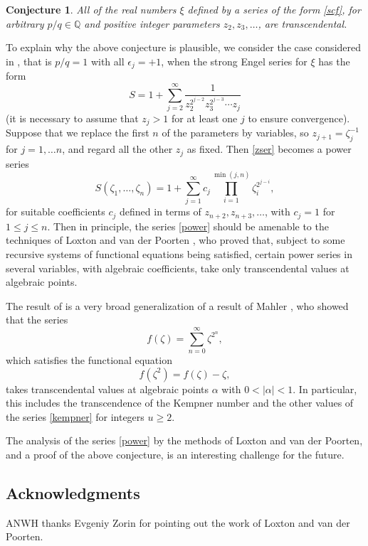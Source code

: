 \documentclass[12pt,a4paper]{amsart}
\newtheorem{conjecture}[theorem]{Conjecture}
\theoremstyle{definition}
\numberwithin{equation}{section}
\newcommand\al{{\alpha}}
\newcommand\eps{{\epsilon}}
\newcommand{\Q}{\mathbb{Q}}
\begin{document}
\begin{conjecture}
\label{transc} 
All of the real numbers $\xi$ defined by a series of the form \eqref{scf}, for arbitrary 
$p/q\in\Q$ and positive integer parameters $z_2,z_3,\ldots$, are transcendental. 
\end{conjecture} 

To explain why the above conjecture is plausible, we consider the case considered in \cite{Hone2}, 
that is $p/q=1$ with all $\eps_j=+1$, when the strong Engel series for $\xi$ has the form 
\begin{equation}
\label{zser}
S = 1+\sum_{j=2}^\infty \frac{1}{z_2^{2^{j-2}}z_3^{2^{j-3}}\cdots z_j} 
\end{equation} 
(it is necessary to assume that $z_j>1$ for at least one $j$ to ensure convergence). 
Suppose that we replace the first $n$ of the parameters by variables, so 
$z_{j+1} = \zeta_{j}^{-1}$ for $j=1,\ldots n$, and regard all the other $z_j$ as fixed. 
Then \eqref{zser} becomes a power series 
\begin{equation}
\label{power} 
S(\zeta_1,\ldots,\zeta_n) = 1+
\sum_{j=1}^\infty c_j \prod_{i=1}^{\min(j,n)}\zeta_i^{2^{j-i}},
\end{equation}  
for suitable coefficients $c_j$ defined in terms of $z_{n+2},z_{n+3},\ldots$, with 
$c_j=1$ for $1\leq j\leq n$. Then in principle, the series \eqref{power} should be amenable to the techniques 
of Loxton and van der Poorten \cite{loxtonvdp}, who proved that, subject to some 
recursive systems of functional equations being 
satisfied, certain power series in several variables, with algebraic coefficients, take 
only transcendental values at algebraic points. 

The result of \cite{loxtonvdp} is a very broad 
generalization of a result of Mahler \cite{mahler}, who showed that the series 
\[ 
f(\zeta) = \sum_{n=0}^\infty \zeta^{2^n}, 
\] 
which satisfies the functional equation 
\[ 
f(\zeta^2) = f(\zeta)-\zeta, 
\] 
takes transcendental values at algebraic points $\al$ with $0<|\al|<1$. In particular, this 
includes the transcendence of the Kempner number and the other values of the series \eqref{kempner} 
for integers $u\geq 2$. 

The analysis of the series \eqref{power} by the methods of Loxton and van der Poorten, and 
a proof of the above conjecture, is an interesting challenge for the future. 

\subsection*{Acknowledgments} 
ANWH thanks Evgeniy Zorin for pointing out the work of Loxton and van der Poorten. 
\end{document}
